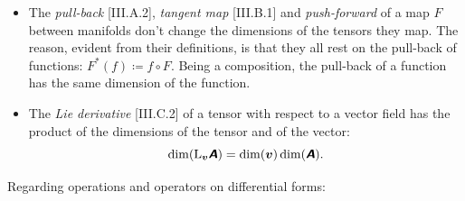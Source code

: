 \documentclass[\ifafour a4paper,12pt,\else a5paper,10pt,\fi%
onecolumn,oneside,article,%
british%
]{memoir}
\theoremstyle{remark}
\theoremstyle{innote}
\newcommand*{\mathte}[1]{\textbf{\textit{\textsf{#1}}}}
\newcommand*{\defd}{\coloneqq}
\renewcommand*{\|}[1][]{\nonscript\,#1\vert\nonscript\;\mathopen{}}
\newcommand*{\Li}{\mathrm{L}}
\newcommand*{\yA}{\mathte{A}}
\newcommand*{\yB}{\mathte{B}}
\newcommand*{\yv}{\bm{v}}
\begin{document}
\begin{itemize}[wide=0pt]
\smallskip

\item The \emph{pull-back} [III.A.2], \emph{tangent map} [III.B.1] and
  \emph{push-forward} of a map $F$ between manifolds don't change the
  dimensions of the tensors they map. The reason, evident from their
  definitions, is that they all rest on the pull-back of functions:
  $F^{*}(f) \defd f\circ F$. Being a composition, the pull-back of a
  function has the same dimension of the function.

\smallskip

\item The \emph{Lie derivative} [III.C.2] of a tensor with respect to a
  vector field has the product of the dimensions of the tensor and of the
  vector:
  \begin{equation}
    \dim(\Li_{\yv}\yA) =\dim(\yv)\dim(\yA).
    \label{eq:lie_der}
\end{equation}
\end{itemize}

\medskip

Regarding operations and operators on differential forms:
\end{document}
